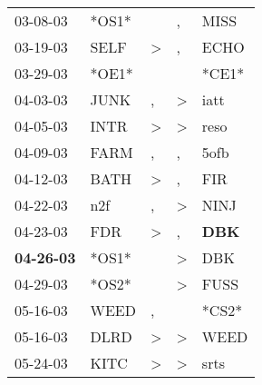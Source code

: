 \begin{supertabular}{p{0.07\textwidth}p{0.06\textwidth}p{0.02\textwidth}p{0.02\textwidth}p{0.06\textwidth}}
          03-08-03\textsuperscript{} &                            *OS1* &                  &                , &           MISS\textsuperscript{} \\
          03-19-03\textsuperscript{} &           SELF\textsuperscript{} &     \textgreater &                , &           ECHO\textsuperscript{} \\
          03-29-03\textsuperscript{} &                            *OE1* &                  &                  &                            *CE1* \\
          04-03-03\textsuperscript{} &           JUNK\textsuperscript{} &                , &     \textgreater &           iatt\textsuperscript{} \\
          04-05-03\textsuperscript{} &           INTR\textsuperscript{} &     \textgreater &     \textgreater &           reso\textsuperscript{} \\
          04-09-03\textsuperscript{} &           FARM\textsuperscript{} &                , &                , &           5ofb\textsuperscript{} \\
          04-12-03\textsuperscript{} &           BATH\textsuperscript{} &     \textgreater &                , &            FIR\textsuperscript{} \\
          04-22-03\textsuperscript{} &            n2f\textsuperscript{} &                , &     \textgreater &           NINJ\textsuperscript{} \\
          04-23-03\textsuperscript{} &            FDR\textsuperscript{} &     \textgreater &                , &   \textbf{DBK\textsuperscript{}} \\
 \textbf{04-26-03\textsuperscript{}} &                            *OS1* &                  &     \textgreater &            DBK\textsuperscript{} \\
          04-29-03\textsuperscript{} &                            *OS2* &                  &     \textgreater &           FUSS\textsuperscript{} \\
          05-16-03\textsuperscript{} &           WEED\textsuperscript{} &                , &                  &                            *CS2* \\
          05-16-03\textsuperscript{} &           DLRD\textsuperscript{} &     \textgreater &     \textgreater &           WEED\textsuperscript{} \\
          05-24-03\textsuperscript{} &           KITC\textsuperscript{} &     \textgreater &     \textgreater &           srts\textsuperscript{} \\

\end{supertabular}
